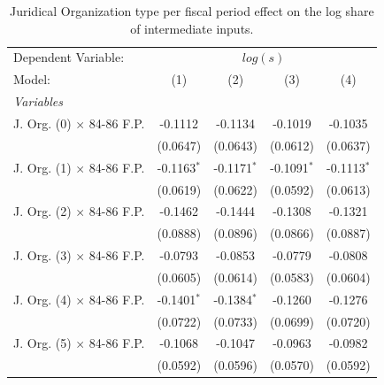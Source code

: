 \documentclass[
  12pt]{article}
\begin{document}
\begin{table}

\caption{\label{tbl-reg-fiscal-p}Juridical Organization type per fiscal
period effect on the log share of intermediate
inputs.}\begin{minipage}[t]{\linewidth}
\subcaption{\label{tbl-reg-fiscal-p-1}}

{\centering 

\begingroup
\centering
\begin{tabular}{lcccc}
   \tabularnewline \midrule \midrule
   Dependent Variable: & \multicolumn{4}{c}{\(log(s)\)}\\
   Model:                           & (1)             & (2)             & (3)             & (4)\\  
   \midrule
   \emph{Variables}\\
   J. Org. (0) $\times$ 84-86 F.P.  & -0.1112         & -0.1134         & -0.1019         & -0.1035\\   
                                    & (0.0647)        & (0.0643)        & (0.0612)        & (0.0637)\\   
   J. Org. (1) $\times$ 84-86 F.P.  & -0.1163$^{*}$   & -0.1171$^{*}$   & -0.1091$^{*}$   & -0.1113$^{*}$\\   
                                    & (0.0619)        & (0.0622)        & (0.0592)        & (0.0613)\\   
   J. Org. (2) $\times$ 84-86 F.P.  & -0.1462         & -0.1444         & -0.1308         & -0.1321\\   
                                    & (0.0888)        & (0.0896)        & (0.0866)        & (0.0887)\\   
   J. Org. (3) $\times$ 84-86 F.P.  & -0.0793         & -0.0853         & -0.0779         & -0.0808\\   
                                    & (0.0605)        & (0.0614)        & (0.0583)        & (0.0604)\\   
   J. Org. (4) $\times$ 84-86 F.P.  & -0.1401$^{*}$   & -0.1384$^{*}$   & -0.1260         & -0.1276\\   
                                    & (0.0722)        & (0.0733)        & (0.0699)        & (0.0720)\\   
   J. Org. (5) $\times$ 84-86 F.P.  & -0.1068         & -0.1047         & -0.0963         & -0.0982\\   
                                    & (0.0592)        & (0.0596)        & (0.0570)        & (0.0592)\\   

\end{tabular}}
\end{minipage}
\end{table}
\end{document}
